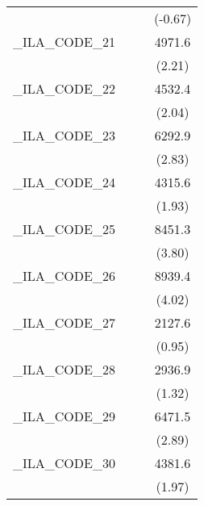 {\begin{tabular}{l*{3}{c}}
            &                     &                     &     (-0.67)         \\
[1em]
\_ILA\_CODE\_21&                     &                     &      4971.6\sym{*}  \\
            &                     &                     &      (2.21)         \\
[1em]
\_ILA\_CODE\_22&                     &                     &      4532.4\sym{*}  \\
            &                     &                     &      (2.04)         \\
[1em]
\_ILA\_CODE\_23&                     &                     &      6292.9\sym{**} \\
            &                     &                     &      (2.83)         \\
[1em]
\_ILA\_CODE\_24&                     &                     &      4315.6         \\
            &                     &                     &      (1.93)         \\
[1em]
\_ILA\_CODE\_25&                     &                     &      8451.3\sym{***}\\
            &                     &                     &      (3.80)         \\
[1em]
\_ILA\_CODE\_26&                     &                     &      8939.4\sym{***}\\
            &                     &                     &      (4.02)         \\
[1em]
\_ILA\_CODE\_27&                     &                     &      2127.6         \\
            &                     &                     &      (0.95)         \\
[1em]
\_ILA\_CODE\_28&                     &                     &      2936.9         \\
            &                     &                     &      (1.32)         \\
[1em]
\_ILA\_CODE\_29&                     &                     &      6471.5\sym{**} \\
            &                     &                     &      (2.89)         \\
[1em]
\_ILA\_CODE\_30&                     &                     &      4381.6\sym{*}  \\
            &                     &                     &      (1.97)         \\

\end{tabular}}
